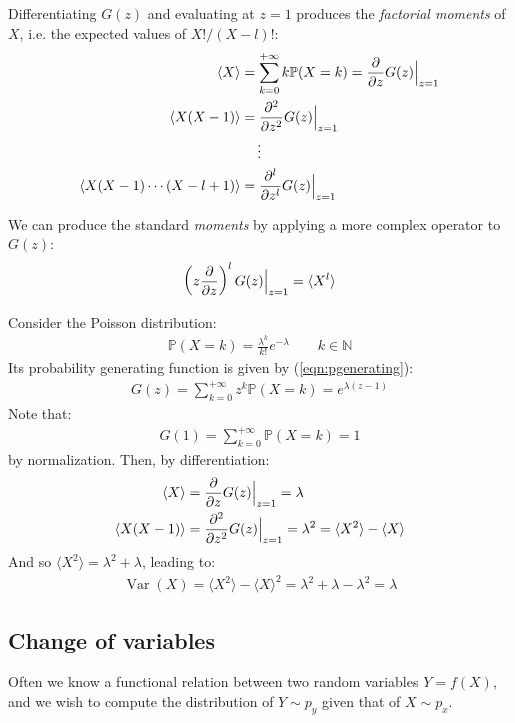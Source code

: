 \documentclass[../../main.tex]{subfiles}
\begin{document}
Differentiating $G(z)$ and evaluating at $z=1$ produces the \textit{factorial moments} of $X$, i.e. the expected values of $X!/(X-l)!$:
\begin{align*}
    \langle X \rangle &= \sum_{k=0}^{+\infty} k \mathbb{P}(X=k) = \pdv{z} G(z)\Big|_{z=1} \\
    \langle X(X-1) \rangle &= \pdv[2]{z} G(z)\Big|_{z =1}\\
    \vdots \span\\
    \langle X(X-1)\cdots (X-l+1) \rangle &= \pdv[l]{z} G(z)\Big|_{z=1}
\end{align*} 

We can produce the standard \textit{moments} by applying a more complex operator to $G(z)$:
\begin{align*}
    \left(z \pdv{z}\right)^l G(z) \Big|_{z=1} = \langle X^l \rangle
\end{align*} 

\begin{example}
    Consider the Poisson distribution:
    \begin{align*}
        \mathbb{P}(X=k) = \frac{\lambda^k}{k!} e^{-\lambda} \qquad k \in \mathbb{N} 
    \end{align*}
    Its probability generating function is given by (\ref{eqn:pgenerating}):
    \begin{align*}
        G(z) = \sum_{k=0}^{+\infty} z^k \mathbb{P}(X=k) = e^{\lambda (z-1)}
    \end{align*}
    Note that:
    \begin{align*}
        G(1) = \sum_{k=0}^{+\infty} \mathbb{P}(X=k) = 1
    \end{align*}
    by normalization. Then, by differentiation:
    \begin{align*}
        \langle X \rangle &=\pdv{z} G(z)\Big|_{z=1} = \lambda\\
        \langle X(X-1) \rangle &= \pdv[2]{z} G(z)\Big|_{z =1} = \lambda^2 = \langle X^2 \rangle  -\langle  X \rangle
    \end{align*}
    And so $\langle X^2 \rangle = \lambda^2 + \lambda$, leading to:
    \begin{align*}
        \operatorname{Var}(X) = \langle X^2 \rangle - \langle X \rangle^2 = \lambda^2 + \lambda - \lambda^2 = \lambda
    \end{align*} 
\end{example}

\subsection{Change of variables}
Often we know a functional relation between two random variables $Y= f(X)$, and we wish to compute the distribution of $Y \sim p_y$ given that of $X \sim p_x$.
\end{document}
